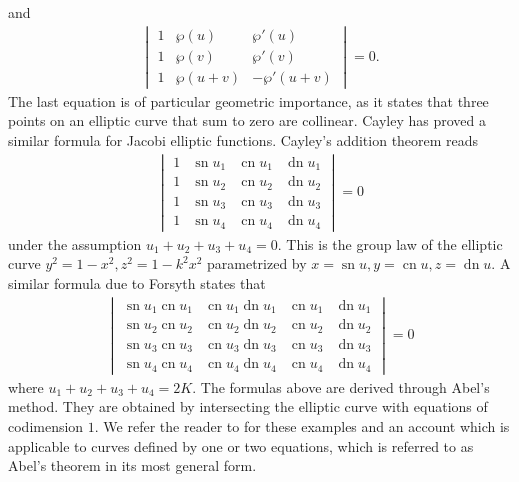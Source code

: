\documentclass{amsart}
\theoremstyle{definition}
\DeclareMathOperator{\dn}{dn}
\DeclareMathOperator{\sn}{sn}
\DeclareMathOperator{\cn}{cn}
\begin{document}
and
\begin{align*}
    \begin{vmatrix}
            1 & \wp(u) & \wp'(u)  \\
            1 & \wp(v) & \wp'(v)  \\
            1 & \wp(u+v) & -\wp'(u+v) 
\end{vmatrix}=0.
\end{align*}
The last equation is of particular geometric importance, as it states that three points on an elliptic curve that sum to zero are collinear. Cayley \cite{CayleyDetAdd} has proved a similar formula for Jacobi elliptic functions. Cayley's addition theorem reads
\begin{align*}
    \begin{vmatrix}
1 & \sn u_1 & \cn u_1 & \dn u_1 \\
1 & \sn u_2 & \cn u_2 & \dn u_2 \\
1 & \sn u_3 & \cn u_3 & \dn u_3 \\
1 & \sn u_4 & \cn u_4 & \dn u_4 
\end{vmatrix}=0
\end{align*}
under the assumption $u_1+u_2+u_3+u_4=0$. This is the group law of the elliptic curve $y^2=1-x^2, z^2=1-k^2x^2$ parametrized by $x=\sn u, y=\cn u, z=\dn u$. A similar formula due to Forsyth \cite{dlmf} states that
\begin{align*}
    \begin{vmatrix}
\sn u_1 \cn u_1 & \cn u_1 \dn u_1 & \cn u_1 & \dn u_1 \\
\sn u_2 \cn u_2 & \cn u_2 \dn u_2 & \cn u_2 & \dn u_2 \\
\sn u_3 \cn u_3 & \cn u_3 \dn u_3 & \cn u_3 & \dn u_3 \\
\sn u_4 \cn u_4 & \cn u_4 \dn u_4 & \cn u_4 & \dn u_4 
\end{vmatrix}=0
\end{align*}
where $u_1+u_2+u_3+u_4=2K$. The formulas above are derived through Abel's method. They are obtained by intersecting the elliptic curve with equations of codimension $1$. We refer the reader to \cite{Forsyththeory} for these examples and an account which is applicable to curves defined by one or two equations, which is referred to as Abel's theorem in its most general form.\medskip
\end{document}
